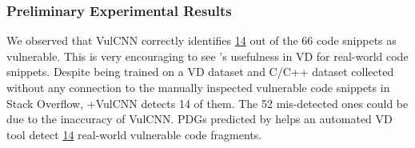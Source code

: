 
\subsubsection*{\bf Preliminary Experimental Results}
We observed that VulCNN correctly identifies \underline{14} out of the
66 code snippets as vulnerable. This is very encouraging to see
{\tool}'s usefulness in VD for real-world code snippets. Despite being
trained on a VD dataset and C/C++ dataset collected without any
connection to the manually inspected vulnerable code snippets in
Stack Overflow, {\tool}+VulCNN detects 14 of them. The 52 mis-detected
ones could be due to the inaccuracy of VulCNN.
PDGs predicted by \tool helps an automated VD tool detect \underline{14} real-world vulnerable code fragments.

